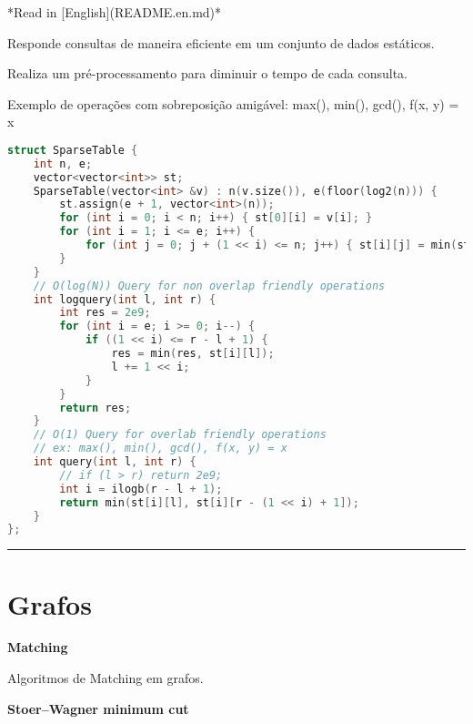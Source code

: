 \documentclass[11pt, a4paper, twoside]{book}
\begin{document}
*Read in [English](README.en.md)*



Responde consultas de maneira eficiente em um conjunto de dados estáticos.\

Realiza um pré-processamento para diminuir o tempo de cada consulta.





Exemplo de operações com sobreposição amigável: max(), min(), gcd(), f(x, y) = x






\hfill

\begin{lstlisting}[language=C++]
struct SparseTable {
    int n, e;
    vector<vector<int>> st;
    SparseTable(vector<int> &v) : n(v.size()), e(floor(log2(n))) {
        st.assign(e + 1, vector<int>(n));
        for (int i = 0; i < n; i++) { st[0][i] = v[i]; }
        for (int i = 1; i <= e; i++) {
            for (int j = 0; j + (1 << i) <= n; j++) { st[i][j] = min(st[i - 1][j], st[i - 1][j + (1 << (i - 1))]); }
        }
    }
    // O(log(N)) Query for non overlap friendly operations
    int logquery(int l, int r) {
        int res = 2e9;
        for (int i = e; i >= 0; i--) {
            if ((1 << i) <= r - l + 1) {
                res = min(res, st[i][l]);
                l += 1 << i;
            }
        }
        return res;
    }
    // O(1) Query for overlab friendly operations
    // ex: max(), min(), gcd(), f(x, y) = x
    int query(int l, int r) {
        // if (l > r) return 2e9;
        int i = ilogb(r - l + 1);
        return min(st[i][l], st[i][r - (1 << i) + 1]);
    }
};
\end{lstlisting}

\hfill

\rule{\textwidth}{0.4pt}

\newpage

%
%
%
%

\chapter{Grafos}



\textbf{Matching} 



Algoritmos de Matching em grafos.





\textbf{Stoer–Wagner minimum cut} 
\end{document}
